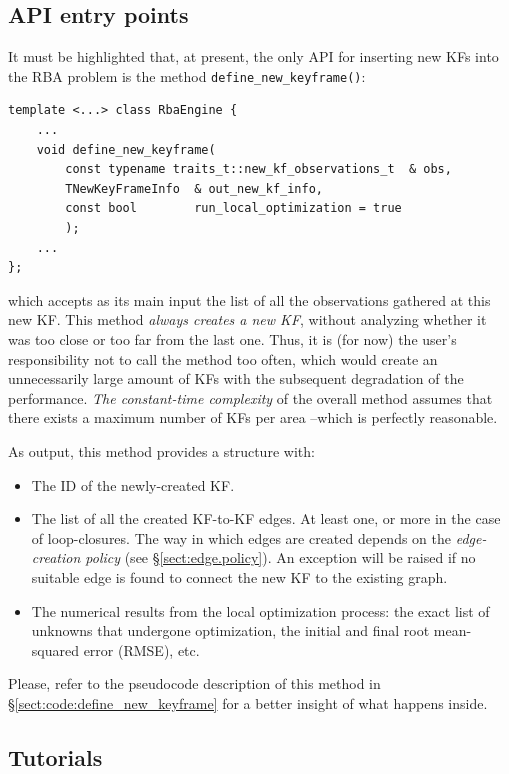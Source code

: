 \documentclass[a4paper,11pt]{article}
\begin{document}
\newpage

\subsection{API entry points}

It must be highlighted that, at present, the only API for inserting new KFs 
into the RBA problem is the method \texttt{define\_new\_keyframe()}:

\begin{lstlisting}
template <...> class RbaEngine {
    ...
	void define_new_keyframe(
		const typename traits_t::new_kf_observations_t  & obs,
		TNewKeyFrameInfo  & out_new_kf_info,
		const bool        run_local_optimization = true
		);
    ...
};
\end{lstlisting}

\noindent which accepts as its main input the list of all the observations gathered at this 
new KF. This method \emph{always creates a new KF}, without analyzing whether it was 
too close or too far from the last one. Thus, it is (for now) the user's responsibility 
not to call the method too often, which would create an unnecessarily large amount of KFs with 
the subsequent degradation of the performance. \emph{The constant-time complexity} of the overall 
method assumes that there exists a maximum number of KFs per area --which is perfectly reasonable.

As output, this method provides a structure with:
\begin{itemize}
 \item The ID of the newly-created KF. 
 \item{ The list of all the created KF-to-KF edges. At least one, or more in the case of loop-closures. 
        The way in which edges are created depends on the \emph{edge-creation policy} (see \S\ref{sect:edge.policy}).
        An exception will be raised if no suitable edge is found to connect the new KF to the existing graph.}
 \item The numerical results from the local optimization process: the exact list of unknowns that undergone optimization, 
       the initial and final root mean-squared error (RMSE), etc.
\end{itemize}

Please, refer to the pseudocode description of this method 
in \S\ref{sect:code:define_new_keyframe} for a better insight of 
what happens inside.


\newpage

\subsection{Tutorials}
\end{document}
